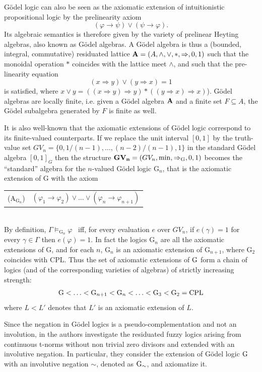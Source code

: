\documentclass{article}
\theoremstyle{definition}
\begin{document}
G\"odel logic can also be seen as the axiomatic extension of intuitionistic propositional logic  by the prelinearity axiom $$(\varphi \to \psi) \lor (\psi \to \varphi).$$  Its algebraic semantics is therefore given by the variety of prelinear Heyting algebras, also known as G\"odel algebras. A G\"odel algebra is thus a (bounded, integral, commutative) residuated lattice ${\bf A} = (A, \land, \lor, *, \Rightarrow, 0, 1)$ such that the monoidal operation $*$ coincides with the lattice meet $\land$,  
and such that the pre-linearity equation $$(x \Rightarrow y) \lor (y \Rightarrow x) = 1 $$
is satisfied, where $x \lor y  = ((x \Rightarrow y) \Rightarrow y) * ((y \Rightarrow x) \Rightarrow x)$). G\"odel algebras are locally finite, i.e. given a G\"odel algebra $\bf A$ and a finite set $F \subseteq A$, the G\"odel subalgebra generated by $F$ is finite as well.

 It is also well-known that the axiomatic extensions of G\"odel logic correspond to its finite-valued counterparts. If we replace the unit interval $[0, 1]$ by the truth-value set
$GV_n = \{0, 1/(n-1), \ldots, (n-2)/(n-1), 1\}$ in the standard G\"odel algebra $[0, 1]_G$  then the structure ${\bf GV_n} = (GV_n, \min, \Rightarrow_\mathrm{G}, 0, 1)$ becomes the ``standard'' algebra for the $n$-valued G\"odel logic G$_n$, that is the axiomatic extension of G with the axiom \\

 \begin{tabular}{l l}
(A$_{\mathrm{G}_n}$) & $ (\varphi_1 \to \varphi_2) \lor \ldots \lor (\varphi_n \to \varphi_{n+1})$ \\
\end{tabular}
\mbox{} \\

\noindent By definition, $\Gamma \models_{\mathrm{G}_n} \varphi$ \ iff, for every evaluation $e$ over $GV_n$, if $e(\gamma) =1$ for every $\gamma \in \Gamma$ then $e(\varphi)=1$.  In fact the logics G$_n$ are all the axiomatic extensions of G, and for each $n$, G$_n$ is an axiomatic extension of G$_{n+1}$, where G$_2$ coincides with CPL. Thus the set of axiomatic extensions of $\rm{G}$ form a chain of logics (and of the corresponding varieties of algebras) of strictly increasing strength:  $${\rm G} < \ldots < {\rm G}_{n+1} < {\rm G}_n < \ldots < {\rm G}_3 < {\rm G}_2 = {\rm CPL}$$
where $L < L'$ denotes that $L'$ is an axiomatic extension of $L$.

Since the negation in G\"odel logics is a pseudo-complementation and not an involution, in \cite{EsGoHaNa} the authors investigate the residuated fuzzy logics arising from  continuous t-norms without non trivial zero divisors and extended with an involutive negation. In particular, they consider the extension of G\"odel logic $\rm{G}$ with an involutive negation $\sim$, denoted as $\rm{G}_\sim$, and axiomatize it.
\end{document}
